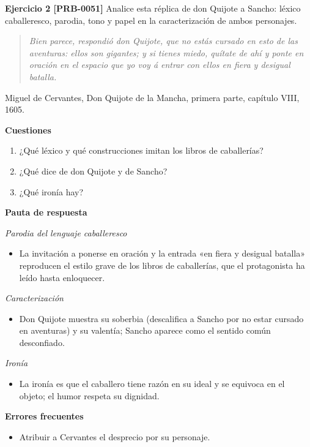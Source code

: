 \documentclass{book}
\begin{document}
\noindent\textbf{Ejercicio 2 [PRB-0051]}
Analice esta réplica de don Quijote a Sancho: léxico caballeresco, parodia, tono y papel en la caracterización de ambos personajes.


\begin{quote}
\itshape Bien parece, respondió don Quijote, que no estás cursado en esto de las aventuras: ellos son gigantes; y si tienes miedo, quítate de ahí y ponte en oración en el espacio que yo voy á entrar con ellos en fiera y desigual batalla.
\end{quote}
{\noindent\footnotesize Miguel de Cervantes, Don Quijote de la Mancha, primera parte, capítulo VIII, 1605.\par}

\noindent\textbf{Cuestiones}
\begin{enumerate}
\item ¿Qué léxico y qué construcciones imitan los libros de caballerías?
\item ¿Qué dice de don Quijote y de Sancho?
\item ¿Qué ironía hay?
\end{enumerate}

\noindent\textbf{Pauta de respuesta}

\noindent\textit{Parodia del lenguaje caballeresco}
\begin{itemize}
\item La invitación a ponerse en oración y la entrada «en fiera y desigual batalla» reproducen el estilo grave de los libros de caballerías, que el protagonista ha leído hasta enloquecer.
\end{itemize}

\noindent\textit{Caracterización}
\begin{itemize}
\item Don Quijote muestra su soberbia (descalifica a Sancho por no estar cursado en aventuras) y su valentía; Sancho aparece como el sentido común desconfiado.
\end{itemize}

\noindent\textit{Ironía}
\begin{itemize}
\item La ironía es que el caballero tiene razón en su ideal y se equivoca en el objeto; el humor respeta su dignidad.
\end{itemize}

\noindent\textbf{Errores frecuentes}
\begin{itemize}
\item Atribuir a Cervantes el desprecio por su personaje.
\end{itemize}
\end{document}
